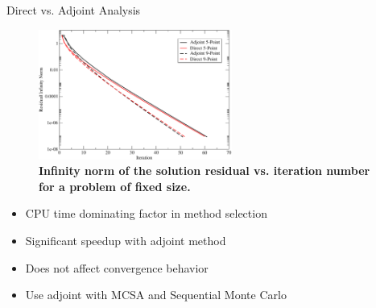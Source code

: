 \documentclass{beamer}
\begin{document}
\begin{frame}{Direct vs. Adjoint Analysis}

  \begin{figure}[h!]
    \centering
    \includegraphics[width=2.5in,clip]{Adjoint_Direct_Convergence.pdf}
    \caption{\textbf{Infinity norm of the solution residual
        vs. iteration number for a problem of fixed size.} }
  \end{figure}

  \begin{itemize}
  \item CPU time dominating factor in method selection
  \item Significant speedup with adjoint method
  \item Does not affect convergence behavior
  \item Use adjoint with MCSA and Sequential Monte Carlo
  \end{itemize}

\end{frame}
\end{document}
